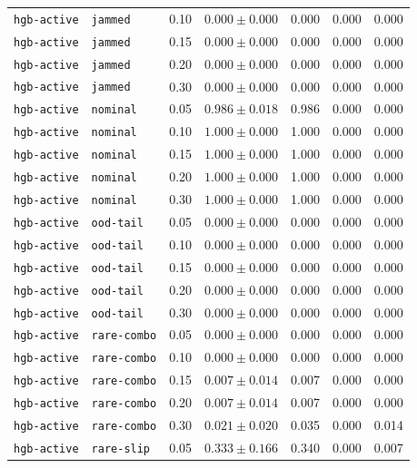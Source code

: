 \documentclass{article}
\begin{document}
\begin{center}
\begin{tabular}{lllcccc}
\texttt{hgb-active} & \texttt{jammed} & 0.10 & $0.000 \pm 0.000$ & 0.000 & 0.000 & 0.000 \\
\texttt{hgb-active} & \texttt{jammed} & 0.15 & $0.000 \pm 0.000$ & 0.000 & 0.000 & 0.000 \\
\texttt{hgb-active} & \texttt{jammed} & 0.20 & $0.000 \pm 0.000$ & 0.000 & 0.000 & 0.000 \\
\texttt{hgb-active} & \texttt{jammed} & 0.30 & $0.000 \pm 0.000$ & 0.000 & 0.000 & 0.000 \\
\texttt{hgb-active} & \texttt{nominal} & 0.05 & $0.986 \pm 0.018$ & 0.986 & 0.000 & 0.000 \\
\texttt{hgb-active} & \texttt{nominal} & 0.10 & $1.000 \pm 0.000$ & 1.000 & 0.000 & 0.000 \\
\texttt{hgb-active} & \texttt{nominal} & 0.15 & $1.000 \pm 0.000$ & 1.000 & 0.000 & 0.000 \\
\texttt{hgb-active} & \texttt{nominal} & 0.20 & $1.000 \pm 0.000$ & 1.000 & 0.000 & 0.000 \\
\texttt{hgb-active} & \texttt{nominal} & 0.30 & $1.000 \pm 0.000$ & 1.000 & 0.000 & 0.000 \\
\texttt{hgb-active} & \texttt{ood-tail} & 0.05 & $0.000 \pm 0.000$ & 0.000 & 0.000 & 0.000 \\
\texttt{hgb-active} & \texttt{ood-tail} & 0.10 & $0.000 \pm 0.000$ & 0.000 & 0.000 & 0.000 \\
\texttt{hgb-active} & \texttt{ood-tail} & 0.15 & $0.000 \pm 0.000$ & 0.000 & 0.000 & 0.000 \\
\texttt{hgb-active} & \texttt{ood-tail} & 0.20 & $0.000 \pm 0.000$ & 0.000 & 0.000 & 0.000 \\
\texttt{hgb-active} & \texttt{ood-tail} & 0.30 & $0.000 \pm 0.000$ & 0.000 & 0.000 & 0.000 \\
\texttt{hgb-active} & \texttt{rare-combo} & 0.05 & $0.000 \pm 0.000$ & 0.000 & 0.000 & 0.000 \\
\texttt{hgb-active} & \texttt{rare-combo} & 0.10 & $0.000 \pm 0.000$ & 0.000 & 0.000 & 0.000 \\
\texttt{hgb-active} & \texttt{rare-combo} & 0.15 & $0.007 \pm 0.014$ & 0.007 & 0.000 & 0.000 \\
\texttt{hgb-active} & \texttt{rare-combo} & 0.20 & $0.007 \pm 0.014$ & 0.007 & 0.000 & 0.000 \\
\texttt{hgb-active} & \texttt{rare-combo} & 0.30 & $0.021 \pm 0.020$ & 0.035 & 0.000 & 0.014 \\
\texttt{hgb-active} & \texttt{rare-slip} & 0.05 & $0.333 \pm 0.166$ & 0.340 & 0.000 & 0.007 \\

\end{tabular}
\end{center}
\end{document}
